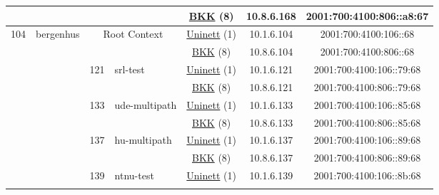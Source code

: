 \begin{small}
\begin{center}
\begin{longtable}{|c|c|c|c|c|c|c|c|}
  &  &  &  & \multicolumn{2}{|c|}{\tiny{\href{http://bkk.no}{BKK} (8)}} & \tiny{10.8.6.168} & \tiny{2001:700:4100:806::a8:67} \\ \hline
 \multirow{18}{*}{\tiny{104}} & \multicolumn{1}{|l|}{\multirow{18}{*}{\tiny{bergenhus}}} & \multicolumn{2}{|c|}{\multirow{2}{*}{\tiny{Root Context}}} & \multicolumn{2}{|c|}{\tiny{\href{https://www.uninett.no}{Uninett} (1)}} & \tiny{10.1.6.104} & \tiny{2001:700:4100:106::68} \\* \cline{5-5}\cline{6-6}\cline{7-7}\cline{8-8}
  &  & \multicolumn{2}{|c|}{} & \multicolumn{2}{|c|}{\tiny{\href{http://bkk.no}{BKK} (8)}} & \tiny{10.8.6.104} & \tiny{2001:700:4100:806::68} \\* \cline{3-3}\cline{4-4}\cline{5-5}\cline{6-6}\cline{7-7}\cline{8-8}
  &  & \multirow{2}{*}{\tiny{121}} & \multicolumn{1}{|l|}{\multirow{2}{*}{\tiny{srl-test}}} & \multicolumn{2}{|c|}{\tiny{\href{https://www.uninett.no}{Uninett} (1)}} & \tiny{10.1.6.121} & \tiny{2001:700:4100:106::79:68} \\* \cline{5-5}\cline{6-6}\cline{7-7}\cline{8-8}
  &  &  &  & \multicolumn{2}{|c|}{\tiny{\href{http://bkk.no}{BKK} (8)}} & \tiny{10.8.6.121} & \tiny{2001:700:4100:806::79:68} \\* \cline{3-3}\cline{4-4}\cline{5-5}\cline{6-6}\cline{7-7}\cline{8-8}
  &  & \multirow{2}{*}{\tiny{133}} & \multicolumn{1}{|l|}{\multirow{2}{*}{\tiny{ude-multipath}}} & \multicolumn{2}{|c|}{\tiny{\href{https://www.uninett.no}{Uninett} (1)}} & \tiny{10.1.6.133} & \tiny{2001:700:4100:106::85:68} \\* \cline{5-5}\cline{6-6}\cline{7-7}\cline{8-8}
  &  &  &  & \multicolumn{2}{|c|}{\tiny{\href{http://bkk.no}{BKK} (8)}} & \tiny{10.8.6.133} & \tiny{2001:700:4100:806::85:68} \\* \cline{3-3}\cline{4-4}\cline{5-5}\cline{6-6}\cline{7-7}\cline{8-8}
  &  & \multirow{2}{*}{\tiny{137}} & \multicolumn{1}{|l|}{\multirow{2}{*}{\tiny{hu-multipath}}} & \multicolumn{2}{|c|}{\tiny{\href{https://www.uninett.no}{Uninett} (1)}} & \tiny{10.1.6.137} & \tiny{2001:700:4100:106::89:68} \\* \cline{5-5}\cline{6-6}\cline{7-7}\cline{8-8}
  &  &  &  & \multicolumn{2}{|c|}{\tiny{\href{http://bkk.no}{BKK} (8)}} & \tiny{10.8.6.137} & \tiny{2001:700:4100:806::89:68} \\* \cline{3-3}\cline{4-4}\cline{5-5}\cline{6-6}\cline{7-7}\cline{8-8}
  &  & \multirow{2}{*}{\tiny{139}} & \multicolumn{1}{|l|}{\multirow{2}{*}{\tiny{ntnu-test}}} & \multicolumn{2}{|c|}{\tiny{\href{https://www.uninett.no}{Uninett} (1)}} & \tiny{10.1.6.139} & \tiny{2001:700:4100:106::8b:68} \\* \cline{5-5}\cline{6-6}\cline{7-7}\cline{8-8}

\end{longtable}
\end{center}
\end{small}
